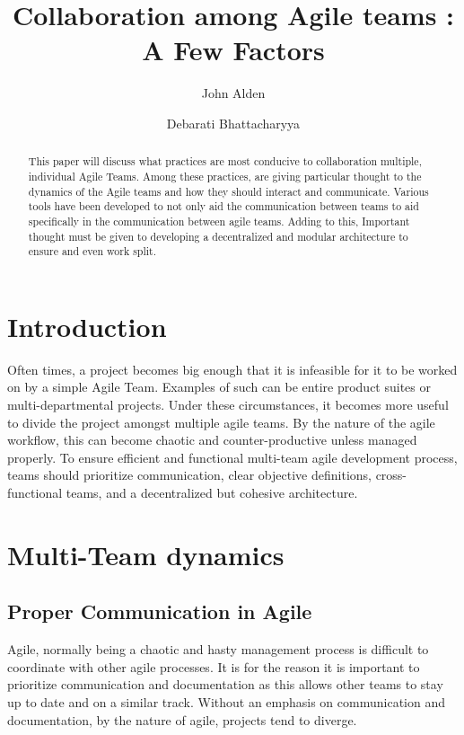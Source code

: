 \documentclass[sigplan,screen]{acmart}
\begin{document}
%
%
\title{Collaboration among Agile teams : A Few Factors}

%
%
\author{John Alden}

\author{Debarati Bhattacharyya}

%
%
\begin{abstract}
This paper will discuss what practices are most conducive to collaboration multiple, individual Agile Teams. Among these practices, are giving particular thought to the dynamics of the Agile teams and how they should interact and communicate. Various tools have been developed to not only aid the communication between teams to aid specifically in the communication between agile teams. Adding to this, Important thought must be given to developing a decentralized and modular architecture to ensure and even work split.
\end{abstract}

%
%
\maketitle

%
%
\section{Introduction}
Often times, a project becomes big enough that it is infeasible for it to be worked on by a simple Agile Team. Examples of such can be entire product suites or multi-departmental projects. Under these circumstances, it becomes more useful to divide the project amongst multiple agile teams. By the nature of the agile workflow, this can become chaotic and counter-productive unless managed properly. To ensure efficient and functional multi-team agile development process, teams should prioritize communication, clear objective definitions, cross-functional teams, and a decentralized but cohesive architecture.

\section{Multi-Team dynamics}
\subsection{Proper Communication in Agile}
Agile, normally being a chaotic and hasty management process is difficult to coordinate with other agile processes. It is for the reason it is important to prioritize communication and documentation as this allows other teams to stay up to date and on a similar track. Without an emphasis on communication and documentation, by the nature of agile, projects tend to diverge.
\end{document}
